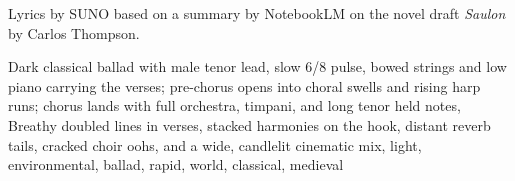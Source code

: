 
\begin{notes}
Lyrics by SUNO based on a summary by NotebookLM on the novel draft \emph{Saulon} by Carlos Thompson.
\end{notes}
\begin{style}
Dark classical ballad with male tenor lead, slow 6/8 pulse, bowed strings and low piano carrying the verses; pre-chorus opens into choral swells and rising harp runs; chorus lands with full orchestra, timpani, and long tenor held notes, Breathy doubled lines in verses, stacked harmonies on the hook, distant reverb tails, cracked choir oohs, and a wide, candlelit cinematic mix, light, environmental, ballad, rapid, world, classical, medieval
\end{style}
